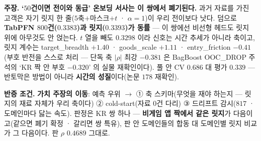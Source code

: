 \documentclass[10pt,a4paper]{article}
\newcommand{\claim}[2]{\begin{claimbox}\textbf{주장.} #1\par\smallskip
  \textcolor{gray!70}{\textbf{반증 조건.} #2}\end{claimbox}}
\begin{document}
\claim{\textbf{`$50$건이면 전이와 동급' 온보딩 서사는 이 쌍에서 폐기된다.}
과거 자료를 가진 고객은 자기 릿지 한 줄($5$축$+$마스크$+t$ · $\alpha{=}1$)이
우리 전이보다 낫다. 덤으로 \textbf{TabPFN $800$건($0.3383$)과 릿지($0.3393$)가
동률} --- 이 쌍에선 비선형 헤드도 릿지 위에 아무것도 안 얹는다. $t$ 열을 빼도
$0.3298$ 이라 신호는 시간 추세가 아니라 축이고, 릿지 계수는 target\_breadth
$+1.40$ · goods\_scale $+1.11$ · entry\_friction $-0.41$(부호 반전을 스스로
처리 --- 단독 축 $|\rho|$ 최강 $-0.381$ 은 BagBoost OOC\_DROP 주석의 `KR 짝 안
부호 $-0.320$' 의 실물 재확인이다). 풀 안 CV $0.686$ 대 평가 $0.339$ ---
반토막은 방법이 아니라 \textbf{시간의 성질}이다(논문 $178$ 재확인).}
{\textbf{가치 주장의 이동}: 예측 우위 $\to$ ① 축 스키마(무엇을 재야 하는지 ---
릿지의 재료 자체가 우리 축이다) ② cold-start(자료 $0$건 다리) ③ 드리프트
감시($817$ · 도메인마다 닳는 속도). 판정은 KR 쌍 하나 --- \textbf{비게임 앱
짝에서 같은 릿지}가 다음이고(같으면 폐기 확정 · 갈리면 쌍 특유), 판 안
도메인들의 합동 대 도메인별 릿지 비교가 그 다음이다. 판 $\rho$ $0.4689$ 그대로.}
\end{document}
